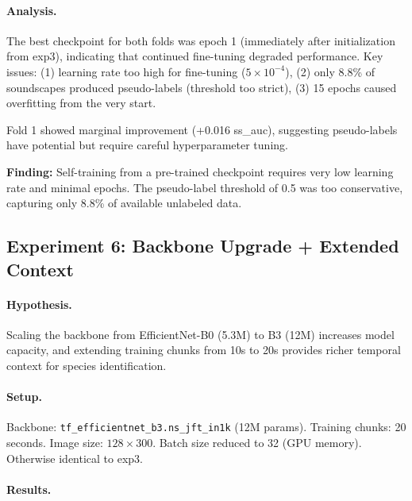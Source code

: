 \paragraph{Analysis.}
The best checkpoint for both folds was epoch 1 (immediately after initialization
from exp3), indicating that continued fine-tuning degraded performance.
Key issues: (1) learning rate too high for fine-tuning ($5 \times 10^{-4}$),
(2) only 8.8\% of soundscapes produced pseudo-labels (threshold too strict),
(3) 15 epochs caused overfitting from the very start.

Fold 1 showed marginal improvement (+0.016 ss\_auc), suggesting pseudo-labels
have potential but require careful hyperparameter tuning.

\textbf{Finding:} Self-training from a pre-trained checkpoint requires very low
learning rate and minimal epochs. The pseudo-label threshold of 0.5 was too
conservative, capturing only 8.8\% of available unlabeled data.

\subsection{Experiment 6: Backbone Upgrade + Extended Context}
\label{sec:exp6}

\paragraph{Hypothesis.}
Scaling the backbone from EfficientNet-B0 (5.3M) to B3 (12M) increases model
capacity, and extending training chunks from 10s to 20s provides richer
temporal context for species identification.

\paragraph{Setup.}
Backbone: \texttt{tf\_efficientnet\_b3.ns\_jft\_in1k} (12M params).
Training chunks: 20 seconds. Image size: $128 \times 300$.
Batch size reduced to 32 (GPU memory). Otherwise identical to exp3.

\paragraph{Results.}

